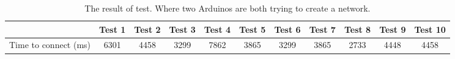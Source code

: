 \begin{table}[ht]
\centering\scriptsize
\begin{tabularx}{\textwidth}{X|c c c c c c c c c c}
                          & Test 1 & Test 2 & Test 3 & Test 4 & Test 5 & Test 6 & Test 7 & Test 8 & Test 9 & Test 10\\
                          \midrule
    Time to connect (ms)  & 6301   & 4458   & 3299   & 7862   & 3865   & 3299   & 3865   & 2733   & 4448   & 4458
\end{tabularx}
\caption{The result of test. Where two Arduinos are both trying to create a network.}
\label{graphConnectime}
\end{table}
